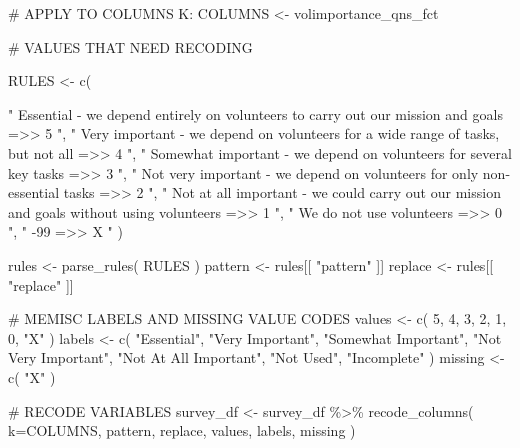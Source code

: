 \documentclass[
  letterpaper,
]{scrbook}
\newenvironment{Shaded}{\begin{snugshade}}{\end{snugshade}}
\newcommand{\AttributeTok}[1]{\textcolor[rgb]{0.40,0.45,0.13}{#1}}
\newcommand{\CommentTok}[1]{\textcolor[rgb]{0.37,0.37,0.37}{#1}}
\newcommand{\DecValTok}[1]{\textcolor[rgb]{0.68,0.00,0.00}{#1}}
\newcommand{\FunctionTok}[1]{\textcolor[rgb]{0.28,0.35,0.67}{#1}}
\newcommand{\NormalTok}[1]{\textcolor[rgb]{0.00,0.23,0.31}{#1}}
\newcommand{\OtherTok}[1]{\textcolor[rgb]{0.00,0.23,0.31}{#1}}
\newcommand{\SpecialCharTok}[1]{\textcolor[rgb]{0.37,0.37,0.37}{#1}}
\newcommand{\StringTok}[1]{\textcolor[rgb]{0.13,0.47,0.30}{#1}}
\begin{document}
\begin{Shaded}
\begin{Highlighting}[]
\CommentTok{\# APPLY TO COLUMNS K:}
\NormalTok{COLUMNS }\OtherTok{\textless{}{-}}\NormalTok{  volimportance\_qns\_fct}

\CommentTok{\# VALUES THAT NEED RECODING}

\NormalTok{RULES }\OtherTok{\textless{}{-}} \FunctionTok{c}\NormalTok{(    }

\StringTok{"           Essential {-} we depend entirely on volunteers to carry out our mission and goals    =\textgreater{}\textgreater{}     5   "}\NormalTok{,}
\StringTok{"           Very important {-} we depend on volunteers for a wide range of tasks, but not all    =\textgreater{}\textgreater{}     4   "}\NormalTok{,}
\StringTok{"                        Somewhat important {-} we depend on volunteers for several key tasks    =\textgreater{}\textgreater{}     3   "}\NormalTok{,}
\StringTok{"                 Not very important {-} we depend on volunteers for only non{-}essential tasks    =\textgreater{}\textgreater{}     2   "}\NormalTok{,}
\StringTok{"  Not at all important {-} we could carry out our mission and goals without using volunteers    =\textgreater{}\textgreater{}     1   "}\NormalTok{,}
\StringTok{"                                                                  We do not use volunteers    =\textgreater{}\textgreater{}     0   "}\NormalTok{,}
\StringTok{"                                                                                       {-}99    =\textgreater{}\textgreater{}     X   "}\NormalTok{    )}

\NormalTok{rules }\OtherTok{\textless{}{-}} \FunctionTok{parse\_rules}\NormalTok{( RULES )          }
\NormalTok{pattern }\OtherTok{\textless{}{-}}\NormalTok{ rules[[ }\StringTok{"pattern"}\NormalTok{ ]]}
\NormalTok{replace }\OtherTok{\textless{}{-}}\NormalTok{ rules[[ }\StringTok{"replace"}\NormalTok{ ]]}

\CommentTok{\# MEMISC LABELS AND MISSING VALUE CODES }
\NormalTok{values  }\OtherTok{\textless{}{-}} \FunctionTok{c}\NormalTok{( }\DecValTok{5}\NormalTok{, }\DecValTok{4}\NormalTok{, }\DecValTok{3}\NormalTok{, }\DecValTok{2}\NormalTok{, }\DecValTok{1}\NormalTok{, }\DecValTok{0}\NormalTok{, }\StringTok{"X"}\NormalTok{ )}
\NormalTok{labels  }\OtherTok{\textless{}{-}} \FunctionTok{c}\NormalTok{( }\StringTok{"Essential"}\NormalTok{, }\StringTok{"Very Important"}\NormalTok{, }\StringTok{"Somewhat Important"}\NormalTok{, }
              \StringTok{"Not Very Important"}\NormalTok{, }\StringTok{"Not At All Important"}\NormalTok{, }\StringTok{"Not Used"}\NormalTok{, }
              \StringTok{"Incomplete"}\NormalTok{ )}
\NormalTok{missing }\OtherTok{\textless{}{-}} \FunctionTok{c}\NormalTok{( }\StringTok{"X"}\NormalTok{ )}

\CommentTok{\# RECODE VARIABLES }
\NormalTok{survey\_df }\OtherTok{\textless{}{-}} 
\NormalTok{  survey\_df }\SpecialCharTok{\%\textgreater{}\%} 
  \FunctionTok{recode\_columns}\NormalTok{( }\AttributeTok{k=}\NormalTok{COLUMNS, pattern, replace, values, labels, missing )}
\end{Highlighting}
\end{Shaded}
\end{document}

